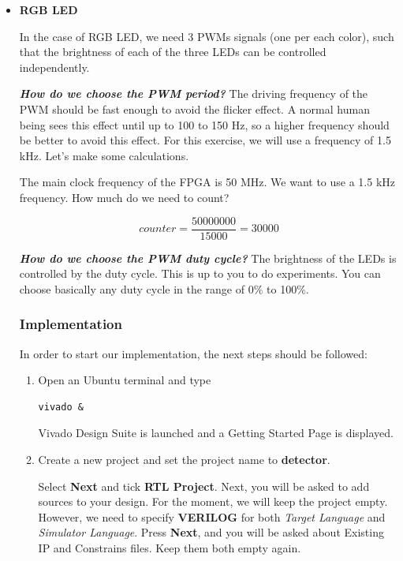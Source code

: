 \documentclass{article}
\begin{document}
\begin{itemize}
\item \textbf{RGB LED}

In the case of RGB LED, we need 3 PWMs signals (one per each color), such that the brightness of each of the three LEDs can be controlled independently.

\textbf{\textit{How do we choose the PWM period?}} The driving frequency of the PWM should be fast enough to avoid the flicker effect. A normal human being sees this effect until up to 100 to 150 Hz, so a higher frequency should be better to avoid this effect. For this exercise, we will use a frequency of 1.5 kHz. Let's make some calculations.

The main clock frequency of the FPGA is 50 MHz. We want to use a 1.5 kHz frequency. How much do we need to count?

\begin{equation}
counter = \frac{50000000}{15000} = 30000
\end{equation}

\textbf{\textit{How do we choose the PWM duty cycle?}} The brightness of the LEDs is controlled by the duty cycle. This is up to you to do experiments. You can choose basically any duty cycle in the range of 0$\%$ to 100$\%$.




\clearpage



\subsubsection{Implementation}

In order to start our implementation, the next steps should be followed:

\begin{enumerate}
\item Open an Ubuntu terminal and type 
\begin{tcolorbox}
\begin{verbatim}
vivado &
\end{verbatim}
\end{tcolorbox}

Vivado Design Suite is launched and a Getting Started Page is displayed.

\item Create a new project and set the project name to \textbf{detector}. 

Select \textbf{Next} and tick \textbf{RTL Project}. 
Next, you will be asked to add sources to your design. For the moment, we will keep the project empty. However, we need to specify \textbf{VERILOG} for both \textit{Target Language} and \textit{Simulator Language}. Press \textbf{Next}, and you will be asked about Existing IP and Constrains files. Keep them both empty again.


\end{enumerate}
\end{itemize}
\end{document}
